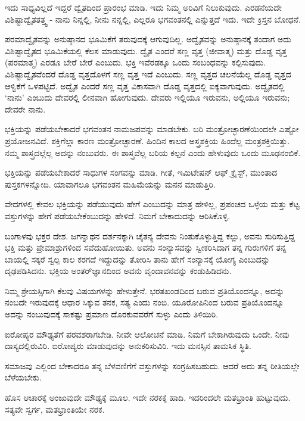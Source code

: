 ಇದು ಸಾಧ್ಯವಿಲ್ಲದೆ ಇದ್ದರೆ ದ್ವೈತದಿಂದ ಪ್ರಾರಂಭ ಮಾಡಿ. ಇದು ನಿಮ್ಮ ಅರಿವಿಗೆ ನಿಲುಕುವುದು. ಎರಡನೆಯದೇ ವಿಶಿಷ್ಟಾದ್ವೈತತತ್ತ್ವ - ನಾನು ನಿನ್ನಲ್ಲಿ, ನೀನು ನನ್ನಲ್ಲಿ, ಎಲ್ಲರೂ ಭಗವಂತನಲ್ಲಿ ಎನ್ನುತ್ತದೆ ಇದು. ಇದೇ ಕ್ರಿಸ್ತನ ಬೋಧನೆ.

ಪರಮಾದ್ವೈತವನ್ನು ಅನುಷ್ಠಾನದ ಭೂಮಿಕೆಗೆ ತರುವುದಕ್ಕೆ ಆಗುವುದಿಲ್ಲ. ಅದ್ವೈತವನ್ನು ಅನುಷ್ಠಾನಕ್ಕೆ ತಂದಾಗ ಅದು ವಿಶಿಷ್ಟಾದ್ವೈತದ ಭೂಮಿಕೆಯಲ್ಲಿ ಕೆಲಸ ಮಾಡುವುದು. ದ್ವೈತ ಎಂದರೆ ಸಣ್ಣ ವೃತ್ತ (ಜೀವಾತ್ಮ) ಮತ್ತು ದೊಡ್ಡ ವೃತ್ತ (ಪರಮಾತ್ಮ) ಎರಡೂ ಬೇರೆ ಬೇರೆ ಎಂಬುದು. ಭಕ್ತಿ ಇವೆರಡಕ್ಕೂ ಒಂದು ಸಂಬಂಧವನ್ನು ಕಲ್ಪಿಸುವುದು. ವಿಶಿಷ್ಟಾದ್ವೈತವೆಂದರೆ ದೊಡ್ಡ ವೃತ್ತದೊಳಗೆ ಸಣ್ಣ ವೃತ್ತ ಇದೆ ಎಂಬುದು. ಸಣ್ಣ ವೃತ್ತದ ಚಲನೆಯೆಲ್ಲ ದೊಡ್ಡ ವೃತ್ತದ ಆಳ್ವಿಕೆಗೆ ಒಳಪಟ್ಟಿದೆ. ಅದ್ವೈತ ಎಂದರೆ ಸಣ್ಣ ವೃತ್ತ ವಿಕಾಸವಾಗಿ ದೊಡ್ಡ ವೃತ್ತದಲ್ಲಿ ಐಕ್ಯವಾಗುವುದು. ಅದ್ವೈತದಲ್ಲಿ ‘ನಾನು’ ಎಂಬುದು ದೇವರಲ್ಲಿ ಲೀನವಾಗಿ ಹೋಗುವುದು. ದೇವರು ಇಲ್ಲಿಯೂ ಇರುವನು, ಅಲ್ಲಿಯೂ ಇರುವನು; ದೇವರೇ ನಾನು.

ಭಕ್ತಿಯನ್ನು ಪಡೆಯಬೇಕಾದರೆ ಭಗವಂತನ ನಾಮಜಪವನ್ನು ಮಾಡಬೇಕು. ಬರಿ ಮಂತ್ರೋಚ್ಛಾರಣೆಯಿಂದಲೇ ಎಷ್ಟೋ ಪ್ರಯೋಜನವಿದೆ. ಶಕ್ತಿಗೆಲ್ಲಾ ಕಾರಣ ಮಂತ್ರೋಚ್ಛಾರಣೆ. ಹಿಂದಿನ ಕಾಲದ ಅಸ್ತ್ರಶಕ್ತಿಯ ಹಿಂದೆಲ್ಲ ಮಂತ್ರಶಕ್ತಿಯಿತ್ತು. ನಮ್ಮ ಶಾಸ್ತ್ರದಲ್ಲೆಲ್ಲ ಅದನ್ನು ನಂಬುವರು. ಈ ಶಾಸ್ತ್ರವೆಲ್ಲ ಬರಿಯ ಕಲ್ಪನೆ ಎಂದು ಹೇಳುವುದು ಒಂದು ಮೂಢನಂಬಿಕೆ.

ಭಕ್ತಿಯನ್ನು ಪಡೆಯಬೇಕಾದರೆ ಸಾಧುಗಳ ಸಂಗವನ್ನು ಮಾಡಿ. ಗೀತೆ, ಇಮಿಟೇಷನ್ ಆಫ್ ಕ್ರೈಸ್ಟ್,  ಮುಂತಾದ ಪುಸ್ತಕಗಳನ್ನೋದಿ. ಯಾವಾಗಲೂ ಭಗವಂತನ ಮಹಿಮೆಯನ್ನು ಮನನ ಮಾಡುತ್ತಿರಿ.

ವೇದಗಳಲ್ಲಿ ಕೇವಲ ಭಕ್ತಿಯನ್ನು ಪಡೆಯುವುದು ಹೇಗೆ ಎಂಬುದನ್ನು ಮಾತ್ರ ಹೇಳಿಲ್ಲ, ಪ್ರಪಂಚದ ಒಳ್ಳೆಯ ಮತ್ತು ಕೆಟ್ಟ ವಸ್ತುಗಳನ್ನು ಹೇಗೆ ಪಡೆಯಬೇಕೆಂಬುದನ್ನು ಹೇಳಿದೆ. ನಿಮಗೆ ಬೇಕಾದುದನ್ನು ಆರಿಸಿಕೊಳ್ಳಿ.

ಬಂಗಾಳವು ಭಕ್ತರ ದೇಶ. ಜಗನ್ನಾಥನ ದರ್ಶನಕ್ಕಾಗಿ ಚೈತನ್ಯ ದೇವನು ನಿಂತುಕೊಳ್ಳುತ್ತಿದ್ದ ಕಲ್ಲು, ಅವನು ಸುರಿಸುತ್ತಿದ್ದ ಭಕ್ತಿ ಮತ್ತು ಪ್ರೇಮಾಶ್ರುಗಳಿಂದ ಸವೆದುಹೋಯಿತು. ಅವನು ಸಂನ್ಯಾಸವನ್ನು ಸ್ವೀಕರಿಸಿದಾಗ ತನ್ನ ಗುರುಗಳಿಗೆ ತನ್ನ ಬಾಯಲ್ಲಿ ಸಕ್ಕರೆ ಸ್ವಲ್ಪ ಕಾಲ ಕರಗದೆ ಇದ್ದುದನ್ನು ತೋರಿಸಿ ತಾನು ಹೇಗೆ ಸಂನ್ಯಾಸಕ್ಕೆ ಯೋಗ್ಯ ಎಂಬುದನ್ನು ದೃಢಪಡಿಸಿದನು. ಭಕ್ತಿಯ ಅಂತರ್‌ಜ್ಞಾನದಿಂದ ಅವನು ವೃಂದಾವನವನ್ನು ಕಂಡುಹಿಡಿದನು.

ನಿಮ್ಮ ಶ್ರೇಯಸ್ಸಿಗಾಗಿ ಕೆಲವು ವಿಷಯಗಳನ್ನು ಹೇಳುತ್ತೇನೆ. ಭರತಖಂಡದಿಂದ ಬರುವ ಪ್ರತಿಯೊಂದನ್ನೂ, ಅದನ್ನು ನಂಬದೇ ಇರುವುದಕ್ಕೆ ಆಧಾರ ಸಿಕ್ಕುವ ತನಕ, ಸತ್ಯ ಎಂದು ನಂಬಿ. ಯೂರೋಪಿನಿಂದ ಬರುವ ಪ್ರತಿಯೊಂದನ್ನೂ ಅದನ್ನು ನಂಬುವುದಕ್ಕೆ ಸಾಕಷ್ಟು ಪ್ರಮಾಣ ದೊರಕುವವರೆಗೆ ಸುಳ್ಳು ಎಂದು ತಿಳಿಯಿರಿ.

ಐರೋಪ್ಯರ ಮೌಢ್ಯತೆಗೆ ಪರವಶರಾಗಬೇಡಿ. ನೀವೇ ಆಲೋಚನೆ ಮಾಡಿ. ನಿಮಗೆ ಬೇಕಾಗಿರುವುದು ಒಂದೇ. ನೀವು ದಾಸ್ಯದಲ್ಲಿರುವಿರಿ. ಐರೋಪ್ಯರು ಮಾಡುವುದನ್ನು ಅನುಕರಿಸುವಿರಿ. ಇದು ಮನಸ್ಸಿನ ತಾಮಸಿಕ ಸ್ಥಿತಿ.

ಸಮಾಜವು ಎಲ್ಲಿಂದ ಬೇಕಾದರೂ ತನ್ನ ಬೆಳವಣಿಗೆಗೆ ವಸ್ತುಗಳನ್ನು ಸಂಗ್ರಹಿಸಬಹುದು. ಆದರೆ ಅದು ತನ್ನ ರೀತಿಯಲ್ಲೇ ಬೆಳೆಯಬೇಕು.

ಹೊಸ ಆಚಾರಕ್ಕೆ ಅಂಜುವುದೇ ಮೌಢ್ಯಕ್ಕೆ ಮೂಲ. ಇದೇ ನರಕಕ್ಕೆ ಹಾದಿ. ಇದರಿಂದಲೇ ಮತಭ್ರಾಂತಿ ಹುಟ್ಟುವುದು. ಸತ್ಯವೇ ಸ್ವರ್ಗ, ಮತಭ್ರಾಂತಿಯೇ ನರಕ.

